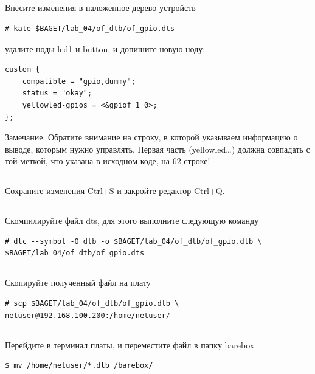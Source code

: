 \subsection{} Внесите изменения в наложенное дерево устройств 
\begin{lstlisting}[style=bash]
# kate $BAGET/lab_04/of_dtb/of_gpio.dts
\end{lstlisting}
удалите ноды led1 и button, и допишите новую ноду:
\begin{lstlisting}[style=stdout]
custom {
	compatible = "gpio,dummy";
	status = "okay";
	yellowled-gpios = <&gpiof 1 0>;
};
\end{lstlisting}
\begin{Notes}{Замечание:}
	Обратите внимание на строку, в которой указываем информацию о выводе, которым нужно управлять. Первая часть (yellowled…) должна совпадать с той меткой, что указана в исходном коде, на 62 строке!
\end{Notes}

\subsection{} Сохраните изменения Ctrl+S и закройте редактор Ctrl+Q. 

\subsection{} Скомпилируйте файл dts, для этого выполните следующую команду
\begin{lstlisting}[style=bash]
# dtc --symbol -O dtb -o $BAGET/lab_04/of_dtb/of_gpio.dtb \
$BAGET/lab_04/of_dtb/of_gpio.dts
\end{lstlisting}
 
\subsection{} Скопируйте полученный файл на плату
\begin{lstlisting}[style=bash]
# scp $BAGET/lab_04/of_dtb/of_gpio.dtb \
netuser@192.168.100.200:/home/netuser/
\end{lstlisting}

\subsection{}Перейдите в терминал платы, и переместите файл в папку barebox
\begin{lstlisting}[style=bash]
$ mv /home/netuser/*.dtb /barebox/
\end{lstlisting}

